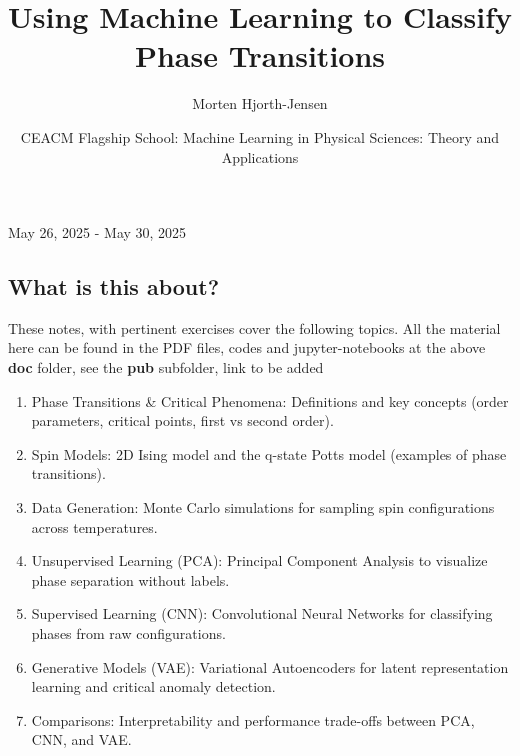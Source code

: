 \documentclass[%
oneside,                 %
final,                   %
10pt]{article}
\begin{document}

\newcommand{\exercisesection}[1]{\subsection*{#1}}






\title{Using Machine Learning to Classify Phase Transitions}


\author{Morten Hjorth-Jensen}

\date{CEACM Flagship School: Machine Learning in Physical Sciences: Theory and Applications
}

May 26, 2025 - May 30, 2025

\subsection{What is this about?}
\begin{block}{}
These notes, with pertinent exercises cover the following topics. All the material here can be found in the PDF files, codes and jupyter-notebooks at the above \textbf{doc} folder, see the \textbf{pub} subfolder, link to be added  
\begin{enumerate}
\item Phase Transitions {\&} Critical Phenomena: Definitions and key concepts (order parameters, critical points, first vs second order).

\item Spin Models: 2D Ising model and the q-state Potts model (examples of phase transitions).

\item Data Generation: Monte Carlo simulations for sampling spin configurations across temperatures.

\item Unsupervised Learning (PCA): Principal Component Analysis to visualize phase separation without labels.

\item Supervised Learning (CNN): Convolutional Neural Networks for classifying phases from raw configurations.

\item Generative Models (VAE): Variational Autoencoders for latent representation learning and critical anomaly detection.

\item Comparisons: Interpretability and performance trade-offs between PCA, CNN, and VAE.
\end{enumerate}

\noindent
\end{block}
\end{document}
